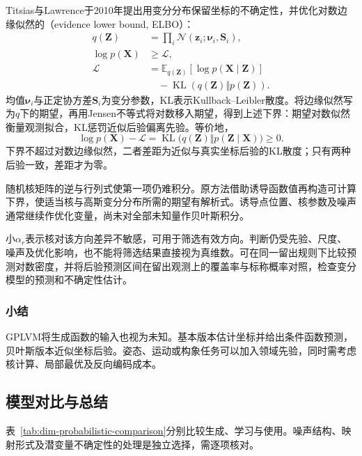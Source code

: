 Titsias与Lawrence于2010年提出用变分分布保留坐标的不确定性，并优化对数边缘似然的（evidence lower bound, ELBO）：
\begin{equation}
\label{eq:dim-gplvm-elbo}
\begin{aligned}
q(\bm{Z})&=\prod_i\mathcal{N}(\bm{z}_i;\bm{\nu}_i,\bm{S}_i),\\
\log p(\bm{X})&\geq\mathcal{L},\\
\mathcal{L}
&=\mathbb{E}_{q(\bm{Z})}[\log p(\bm{X}\mid\bm{Z})]\\
&\quad-\operatorname{KL}(q(\bm{Z})\Vert p(\bm{Z})).
\end{aligned}
\end{equation}
均值$\bm{\nu}_i$与正定协方差$\bm{S}_i$为变分参数，KL表示Kullback--Leibler散度。将边缘似然写为$q$下的期望，再用Jensen不等式将对数移入期望，得到上述下界：期望对数似然衡量观测拟合，KL惩罚近似后验偏离先验。等价地，
\[
  \log p(\bm{X})-\mathcal{L}
  =\operatorname{KL}\bigl(q(\bm{Z})\Vert p(\bm{Z}\mid\bm{X})\bigr)
  \geq0.
\]
下界不超过对数边缘似然，二者差距为近似与真实坐标后验的KL散度；只有两种后验一致，差距才为零。

随机核矩阵的逆与行列式使第一项仍难积分。原方法借助诱导函数值再构造可计算下界，使适当核与高斯变分分布所需的期望有解析式。诱导点位置、核参数及噪声通常继续作优化变量，尚未对全部未知量作贝叶斯积分。

小$\alpha_r$表示核对该方向差异不敏感，可用于筛选有效方向。判断仍受先验、尺度、噪声及优化影响，也不能将筛选结果直接视为真维数。可在同一留出规则下比较预测对数密度，并将后验预测区间在留出观测上的覆盖率与标称概率对照，检查变分模型的预测和不确定性估计。

\subsubsection{小结}
\label{sec:dim-gplvm-summary}

GPLVM将生成函数的输入也视为未知。基本版本估计坐标并给出条件函数预测，贝叶斯版本近似坐标后验。姿态、运动或构象任务可以加入领域先验，同时需考虑核计算、局部最优及反向编码成本。

\subsection{模型对比与总结}
\label{sec:dim-probabilistic-comparison}

表~\ref{tab:dim-probabilistic-comparison}分别比较生成、学习与使用。噪声结构、映射形式及潜变量不确定性的处理是独立选择，需逐项核对。

